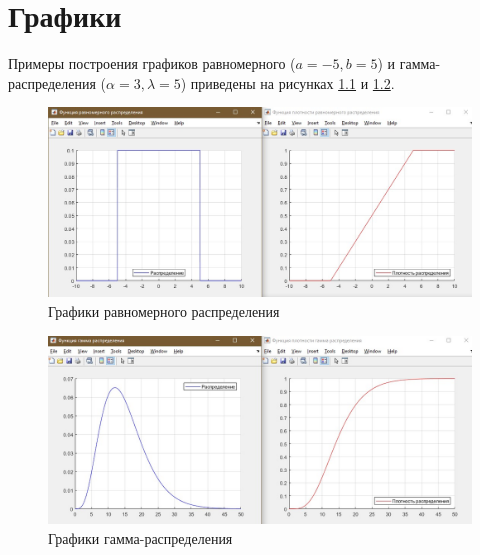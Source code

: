 \chapter{Графики}

Примеры построения графиков равномерного ($a = -5, b = 5$) и гамма-распределения ($\alpha = 3, \lambda = 5$) приведены на рисунках \ref{g1} и \ref{g2}.

\begin{figure}[h]
	\includegraphics[width=1\linewidth]{inc/img/g1}
	\caption{Графики равномерного распределения}
	\label{g1}
\end{figure}

\begin{figure}[h]
	\includegraphics[width=1\linewidth]{inc/img/g2}
	\caption{Графики гамма-распределения}
	\label{g2}
\end{figure}
%
